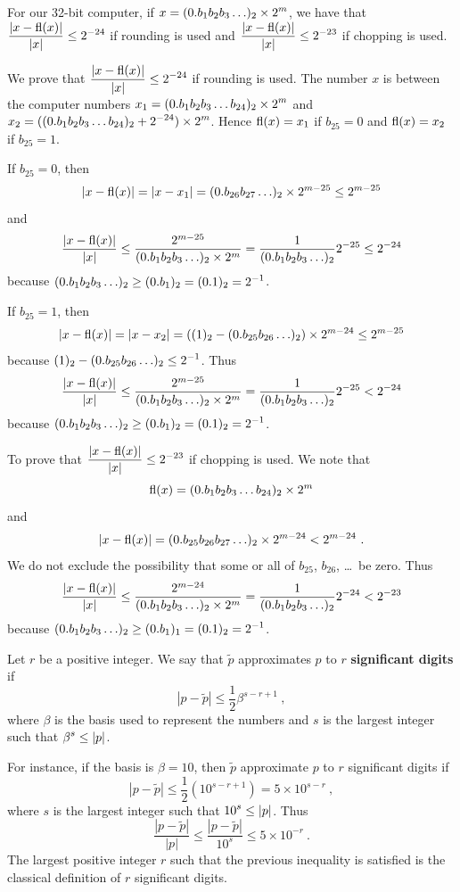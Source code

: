 \begin{rmk}
For our 32-bit computer, if
$\displaystyle x=(0.b_1 b_2 b_3\ldots)_2 \times 2^m$, we 
have that $\displaystyle \frac{|x-\operatorname{fl}(x)|}{|x|} \leq 2^{-24}$ if rounding
is used and $\displaystyle \frac{|x-\operatorname{fl}(x)|}{|x|} \leq 2^{-23}$ if
chopping is used.

 We prove that $\displaystyle \frac{|x-\operatorname{fl}(x)|}{|x|}
\leq 2^{-24}$ if rounding is used.  The number $x$ is between the
computer numbers
$\displaystyle x_1 = (0.b_1b_2b_3\ldots b_{24})_2 \times 2^m$ and
$\displaystyle x_2 = ((0.b_1b_2b_3\ldots b_{24})_2 + 2^{-24}) \times 2^m$.
Hence $\operatorname{fl}(x) = x_1$ if $b_{25} =0$ and $\operatorname{fl}(x) = x_2$ if $b_{25}=1$.

If $b_{25}=0$, then
\[
|x-\operatorname{fl}(x)| = | x- x_1 | = (0.b_{26} b_{27} \ldots)_2 \times 2^{m-25}
\leq 2^{m-25}
\]
and
\[
\frac{|x-\operatorname{fl}(x)|}{|x|} \leq
\frac{2^{m-25}}{(0.b_1 b_2 b_3\ldots)_2 \times 2^m}
= \frac{1}{(0.b_1 b_2 b_3\ldots)_2} 2^{-25} \leq 2^{-24}
\]
because
$\displaystyle (0.b_1 b_2 b_3\ldots)_2 \geq (0.b_1)_2 = (0.1)_2 = 2^{-1}$.

If $b_{25}=1$, then
\[
|x-\operatorname{fl}(x)| = | x- x_2 | = ((1)_2 - (0.b_{25} b_{26} \ldots)_2) \times 2^{m-24}
\leq 2^{m-25}
\]
because $\displaystyle (1)_2-(0.b_{25}b_{26} \ldots)_2 \leq 2^{-1}$.  Thus
\[
\frac{|x-\operatorname{fl}(x)|}{|x|} \leq
\frac{2^{m-25}}{(0.b_1 b_2 b_3\ldots)_2 \times 2^m}
= \frac{1}{(0.b_1 b_2 b_3\ldots)_2} 2^{-25}
< 2^{-24}
\]
because $\displaystyle (0.b_1b_2b_3\ldots)_2 \geq (0.b_1)_2 =
(0.1)_2 = 2^{-1}$.

 To prove that
$\displaystyle \frac{|x-\operatorname{fl}(x)|}{|x|} \leq 2^{-23}$ if
chopping is used.  We note that
\[
\operatorname{fl}(x) = (0.b_1b_2b_3\ldots b_{24})_2 \times 2^m
\]
and
\[
|x-\operatorname{fl}(x)| =  (0.b_{25}b_{26} b_{27} \ldots)_2 \times 2^{m-24}
< 2^{m-24} \ .
\]
We do not exclude the possibility that some or all of $b_{25}$,
$b_{26}$, \ldots\ be zero. Thus
\[
\frac{|x-\operatorname{fl}(x)|}{|x|} \leq
\frac{2^{m-24}}{(0.b_1 b_2 b_3\ldots)_2 \times 2^m}
= \frac{1}{(0.b_1 b_2 b_3\ldots)_2} 2^{-24}
< 2^{-23}
\]
because $\displaystyle (0.b_1b_2b_3\ldots)_2 \geq (0.b_1)_1 = (0.1)_2 = 2^{-1}$.
\end{rmk}

\begin{defn}
Let $r$ be a positive integer.  We say that $\tilde{p}$
approximates $p$ to $r$
{\bfseries significant digits} if
\[
|p - \tilde{p}| \leq \frac{1}{2} \beta^{s-r+1} \ ,
\]
where $\beta$ is the basis used to represent the numbers and $s$
is the largest integer such that $\displaystyle \beta^s \leq |p|$.
\end{defn}

For instance, if the basis is $\beta = 10$, then $\tilde{p}$
approximate $p$ to $r$ significant digits if
\[
|p - \tilde{p}| \leq \frac{1}{2} \left( 10^{s-r+1} \right) = 5 \times 10^{s-r}
\ ,
\]
where $s$ is the largest integer such that $\displaystyle 10^s \leq |p|$.  Thus
\[
\frac{|p - \tilde{p}|}{|p|} \leq \frac{|p - \tilde{p}|}{10^s}
\leq 5 \times 10^{-r} \ .
\]
The largest positive integer $r$ such that the previous inequality is
satisfied is the classical definition of $r$ significant digits. 

